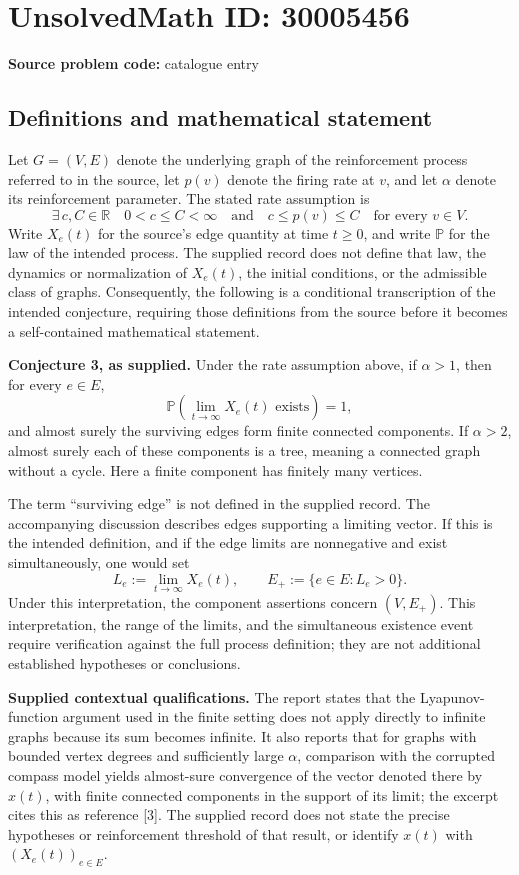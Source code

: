 \documentclass[11pt]{article}
\newcommand{\R}{\mathbb{R}}
\begin{document}
\section*{UnsolvedMath ID: 30005456}
\textbf{Source problem code:} catalogue entry
\subsection{Definitions and mathematical statement}
Let \(G=(V,E)\) denote the underlying graph of the reinforcement process referred to in the source, let \(p(v)\) denote the firing rate at \(v\), and let \(\alpha\) denote its reinforcement parameter. The stated rate assumption is
\[
\exists\,c,C\in\R\quad 0<c\le C<\infty\quad\text{and}\quad c\le p(v)\le C\quad\text{for every }v\in V.
\]
Write \(X_e(t)\) for the source's edge quantity at time \(t\ge0\), and write \(\mathbb P\) for the law of the intended process. The supplied record does not define that law, the dynamics or normalization of \(X_e(t)\), the initial conditions, or the admissible class of graphs. Consequently, the following is a conditional transcription of the intended conjecture, requiring those definitions from the source before it becomes a self-contained mathematical statement.

\textbf{Conjecture 3, as supplied.} Under the rate assumption above, if \(\alpha>1\), then for every \(e\in E\),
\[
\mathbb P\!\left(\lim_{t\to\infty}X_e(t)\text{ exists}\right)=1,
\]
and almost surely the surviving edges form finite connected components. If \(\alpha>2\), almost surely each of these components is a tree, meaning a connected graph without a cycle. Here a finite component has finitely many vertices.

The term ``surviving edge'' is not defined in the supplied record. The accompanying discussion describes edges supporting a limiting vector. If this is the intended definition, and if the edge limits are nonnegative and exist simultaneously, one would set
\[
L_e:=\lim_{t\to\infty}X_e(t),\qquad E_+:=\{e\in E:L_e>0\}.
\]
Under this interpretation, the component assertions concern \((V,E_+)\). This interpretation, the range of the limits, and the simultaneous existence event require verification against the full process definition; they are not additional established hypotheses or conclusions.

\textbf{Supplied contextual qualifications.} The report states that the Lyapunov-function argument used in the finite setting does not apply directly to infinite graphs because its sum becomes infinite. It also reports that for graphs with bounded vertex degrees and sufficiently large \(\alpha\), comparison with the corrupted compass model yields almost-sure convergence of the vector denoted there by \(x(t)\), with finite connected components in the support of its limit; the excerpt cites this as reference [3]. The supplied record does not state the precise hypotheses or reinforcement threshold of that result, or identify \(x(t)\) with \((X_e(t))_{e\in E}\).
\end{document}
